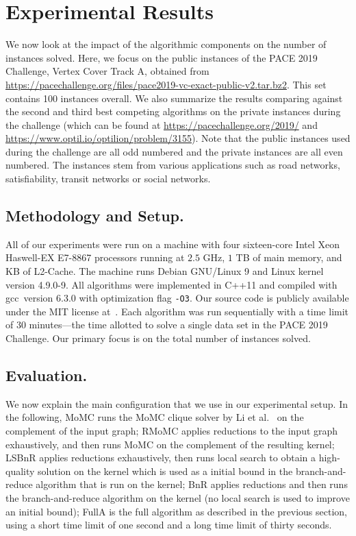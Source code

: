 \documentclass[twoside,leqno,twocolumn]{article}
\newcommand{\AlgName}[1]{\textsf{#1}}
\begin{document}
\section{Experimental Results}
\label{sec:experiments}
We now look at the impact of the algorithmic components on the number of instances solved.
Here, we focus on the public instances  of the PACE 2019 Challenge, Vertex Cover Track A, obtained from \url{https://pacechallenge.org/files/pace2019-vc-exact-public-v2.tar.bz2}. This set contains 100 instances overall. We also summarize the results comparing against the second and third best competing algorithms on the private instances during the challenge (which can be found at \url{https://pacechallenge.org/2019/} and \url{https://www.optil.io/optilion/problem/3155}). Note that the public instances used during the challenge are all odd numbered and the private instances are all even numbered. The instances stem from various applications such as road networks, satisfiability, transit networks or social networks.

\subsection{Methodology and Setup.}
All of our experiments were run on a machine with  four sixteen-core Intel Xeon Haswell-EX E7-8867 processors running at $2.5$ GHz, $1$ TB of main memory, and  KB of L2-Cache.
The machine runs Debian GNU/Linux 9 and Linux kernel version 4.9.0-9.
All algorithms were implemented in C++11 and compiled with gcc~version 6.3.0 with optimization flag \texttt{-O3}. Our source code is publicly available under the MIT license at~\cite{wegotyoucovered2019}.
Each algorithm was run sequentially with a time limit of 30 minutes---the time allotted to solve a single data set in the PACE 2019 Challenge. Our primary focus is on the total number of instances solved.
\subsection{Evaluation.}
We now explain the main configuration that we use in our experimental setup.
In the following, \AlgName{MoMC} runs the MoMC clique solver by Li et
al.~\cite{DBLP:journals/cor/LiJM17} on the complement of the input graph;
\AlgName{RMoMC} applies reductions to the input graph exhaustively, and then
runs MoMC on the complement of the resulting kernel; \AlgName{LSBnR} applies
reductions exhaustively, then runs local search to obtain a high-quality
solution on the kernel which is used as a initial bound in the branch-and-reduce
algorithm that is run on the kernel; \AlgName{BnR} applies reductions and then
runs the branch-and-reduce algorithm on the kernel (no local search is used to
improve an initial bound); \AlgName{FullA} is the full algorithm as described in
the previous section, using a short time limit of one second and a long time limit of thirty seconds.
\end{document}
